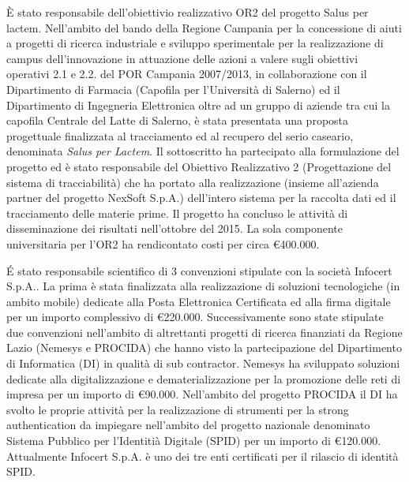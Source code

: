 \documentclass[11pt,a4paper,sans]{moderncv}        %
\begin{document}
{
\`E stato responsabile dell'obiettivio realizzativo OR2 del progetto Salus per lactem. Nell'ambito del bando della Regione Campania per la concessione di aiuti a progetti di ricerca industriale e sviluppo sperimentale per la realizzazione di campus dell’innovazione in attuazione delle azioni a valere sugli obiettivi operativi 2.1 e 2.2. del POR Campania 2007/2013, in collaborazione con il Dipartimento di Farmacia (Capofila per l'Università di Salerno) ed il Dipartimento di Ingegneria Elettronica oltre ad un gruppo di aziende tra cui la capofila Centrale del Latte di Salerno, è stata presentata una proposta progettuale finalizzata al tracciamento ed al recupero del serio caseario, denominata {\em Salus per Lactem}. 
Il sottoscritto ha partecipato alla formulazione del progetto ed è stato responsabile del Obiettivo Realizzativo 2 (Progettazione del sistema di tracciabilità) che ha portato alla realizzazione (insieme all'azienda partner del progetto NexSoft S.p.A.) dell'intero sistema per la raccolta dati ed il tracciamento delle materie prime. 
Il progetto ha concluso le attività di disseminazione dei risultati nell'ottobre del 2015.
La sola componente universitaria per l'OR2 ha rendicontato costi per circa \euro{400.000}.
}


{
\'E stato responsabile scientifico di 3 convenzioni stipulate con la società Infocert S.p.A.. La prima è stata finalizzata alla realizzazione di soluzioni tecnologiche (in ambito mobile) dedicate alla Posta Elettronica Certificata ed alla firma digitale per un importo complessivo di \euro{220.000}. Successivamente sono state stipulate due convenzioni nell'ambito di altrettanti progetti di ricerca finanziati da Regione Lazio (Nemesys e PROCIDA) che hanno visto la partecipazione del Dipartimento di Informatica (DI) in qualità di sub contractor. Nemesys ha sviluppato soluzioni dedicate alla digitalizzazione e dematerializzazione per la promozione delle reti di impresa per un importo di \euro{90.000}. Nell'ambito del progetto PROCIDA il DI ha svolto le proprie attività per la realizzazione di strumenti per la strong authentication da impiegare nell’ambito del progetto nazionale denominato Sistema Pubblico per l'Identitià Digitale (SPID) per un importo di \euro{120.000}. Attualmente Infocert S.p.A. è uno dei tre enti certificati per il rilascio di identità SPID.
}
\end{document}

